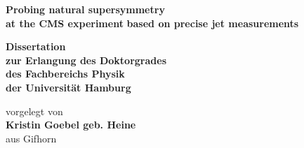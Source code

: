 \documentclass[
twoside=true,
BCOR10mm,
headsepline,     %
headings=normal,
open=right,
numbers=noenddot, %
a4paper
]{scrreprt} %
\author{Kristin Goebel}
\begin{document}
\begin{titlepage}
  \begin{center}
    \thispagestyle{empty}
    \vspace*{1cm}
    \begin{doublespace} 
       \textbf{\Huge Probing natural supersymmetry} \\
       \vskip0.4cm
       \textbf{\Huge at the CMS experiment}
       \vskip0.4cm
       \textbf{\Huge based on precise jet measurements}
      \vskip2.5cm
      \begin{Large} 
        \textbf{Dissertation\\
          zur Erlangung des Doktorgrades\\
          des Fachbereichs Physik\\
          der Universit\"{a}t Hamburg\\}
      \end{Large}
      \vskip2cm
      \begin{large}
        vorgelegt von\\
        {\bf Kristin Goebel geb. Heine}\\
        aus Gifhorn
        \vfill
      \end{large}
    \end{doublespace} 
  \end{center}
\end{titlepage}


\newpage 
\thispagestyle{empty}
\quad 
\newpage
\thispagestyle{empty}
\end{document}
